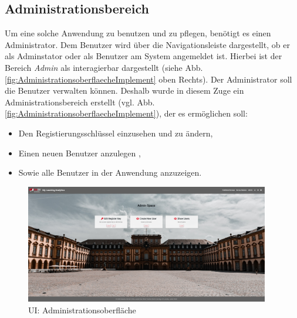 
\subsection{Administrationsbereich}
\label{ssec:Administrationsbereich}

Um eine solche Anwendung zu benutzen und zu pflegen, benötigt es einen Administrator.
Dem Benutzer wird über die Navigationsleiste dargestellt, ob er als Adminstator oder als Benutzer am System angemeldet ist. 
Hierbei ist der Bereich \emph{Admin} als interagierbar dargestellt (siehe Abb. \vref{fig:AdministrationsoberflaecheImplement} oben Rechts). \newline
Der Administrator soll \ua die Benutzer verwalten können. 
Deshalb wurde in diesem Zuge ein Administrationsbereich erstellt (vgl. Abb. \vref{fig:AdministrationsoberflaecheImplement}), der es ermöglichen soll: 
%
\begin{itemize}
    \item Den Registierungsschlüssel \faKey\xspace einzusehen und zu ändern,
	\item Einen neuen Benutzer anzulegen \faUser,
    \item Sowie alle Benutzer \faUsers\xspace in der Anwendung anzuzeigen. 
\end{itemize}
%
\begin{figure}[hp]
	\centering
	\includegraphics[width=0.95\textwidth, keepaspectratio]{img/client/Admin.png}
	\captionsetup{justification=centering, format=plain}
	\caption[\acf{UI}: Administrationsoberfläche]{\acf{UI}: Administrationsoberfläche \\ \quelleScreenshot}
	\label{fig:AdministrationsoberflaecheImplement}
\end{figure}
%






